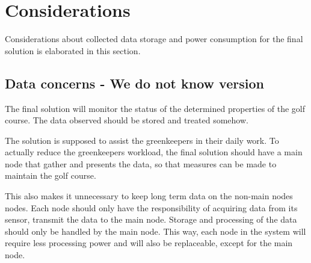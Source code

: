 \section{Considerations}
Considerations about collected data storage and power consumption for the final solution is elaborated in this section.

\subsection{Data concerns - We do not know version}
The final solution will monitor the status of the determined properties of the golf course. The data observed should be stored and treated somehow.

The solution is supposed to assist the greenkeepers in their daily work. To actually reduce the greenkeepers workload, the final solution should have a main node that gather and presents the data, so that measures can be made to maintain the golf course.


This also makes it unnecessary to keep long term data on the non-main nodes nodes. 
Each node should only have the responsibility of acquiring data from its sensor, transmit the data to the main node. 
Storage and processing of the data should only be handled by the main node. 
This way, each node in the system will require less processing power and will also be replaceable, except for the main node.



